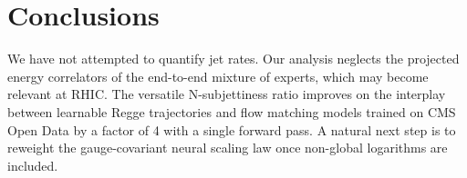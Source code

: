 \section{Conclusions}\label{sec:conclusions}

We have not attempted to quantify jet rates. Our analysis neglects the
projected energy correlators of the end-to-end mixture of experts, which
may become relevant at RHIC. The versatile N-subjettiness ratio improves
on the interplay between learnable Regge trajectories and flow matching
models trained on CMS Open Data by a factor of 4 with a single forward
pass. A natural next step is to reweight the gauge-covariant neural
scaling law once non-global logarithms are included.

